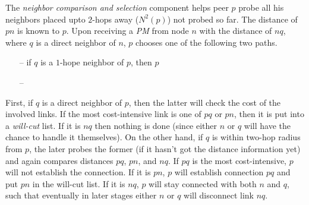 The \emph{neighbor comparison and selection} component
helps peer $p$ probe all his neighbors placed upto 
$2$-hops away ($ N^2(p)$) %
not probed so far.
The distance of $pn$ is known to $p$. %
Upon receiving a \emph{PM} from node $n$ with the distance of $nq$, 
where $q$ is a direct
neighbor of $n$, $p$ chooses one of the following two paths. 
\begin{itemize} %
\item[--]
	if $q$ is a $1$-hope neighbor of $p$, then 
	$p$ 
\item[--]
\end{itemize}
First, if $q$ is a
direct neighbor of $p$, then the latter will check the cost of the involved
links. If the most cost-intensive link is one of $pq$ or $pn$, then it is put
into a \emph{will-cut} list. If it is $nq$ then nothing is done (since either
$n$ or $q$ will have the chance to handle it themselves).  
On the other hand, if
$q$ is within two-hop radius from $p$, the later probes the former (if it hasn't
got the distance information yet) and again compares distances $pq$, $pn$, and
$nq$. If $pq$ is the most cost-intensive, $p$ will not establish the connection.
If it is $pn$, $p$ will establish connection $pq$ and put $pn$ in the will-cut
list. 
If it is $nq$, $p$ will stay connected with both $n$ and $q$,
such that eventually in later stages either $n$ or $q$ will disconnect link $nq$.  
%
%
